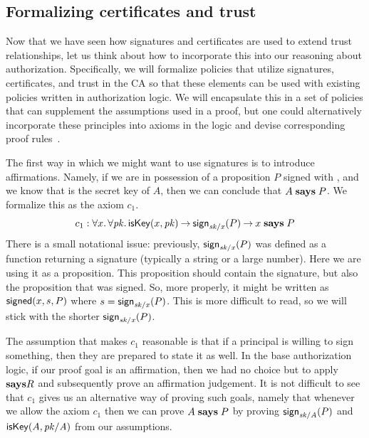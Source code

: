 \documentclass[11pt]{article}
\begin{document}
\subsection{Formalizing certificates and trust}

Now that we have seen how signatures and certificates are used to
extend trust relationships, let us think about how to incorporate this
into our reasoning about authorization. Specifically, we will
formalize policies that utilize signatures, certificates, and trust in
the CA so that these elements can be used with existing policies
written in authorization logic. We will encapsulate this in a set of
policies that can supplement the assumptions used in a proof, but one
could alternatively incorporate these principles into axioms in the
logic and devise corresponding proof rules~\citep{Bauer03phd}.

The first way in which we might want to use signatures is to introduce
affirmations. Namely, if we are in possession of a proposition $P$ signed with
, and we know that  is the secret key of $A$, then we can conclude
that $A \mathrel{\mathbf{says}} P$. We formalize this as the axiom $c_1$.
\[
  c_1 : \forall x.\, \forall \mathit{pk}.\, \mathsf{isKey}(x, \mathit{pk}) \mathbin{\rightarrow} \mathsf{sign}_{\mathit{sk/x}}(P) \mathbin{\rightarrow} x \mathrel{\mathbf{says}} P
\]
There is a small notational issue: previously, $\mathsf{sign}_{\mathit{sk/x}}(P)$ was defined
as a function returning a signature (typically a string or a large number).
Here we are using it as a proposition.  This proposition should contain the
signature, but also the proposition that was signed.  So, more properly, it
might be written as $\mathsf{signed}(x, s, P)$ where $s = \mathsf{sign}_{\mathit{sk/x}}(P)$.
This is more difficult to read, so we will stick with the shorter
$\mathsf{sign}_{\mathit{sk/x}}(P)$.

The assumption that makes $c_1$ reasonable is that if a principal is willing to
sign something, then they are prepared to state it as well.  In the base
authorization logic, if our proof goal is an affirmation, then we had no
choice but to apply ${\mathrel{\mathbf{says}}}R$ and subsequently prove an affirmation
judgement. It is not difficult to see that $c_1$ gives us an alternative way of
proving such goals, namely that whenever we allow the axiom $c_1$ then we can
prove $A \mathrel{\mathbf{says}} P$ by proving $\mathsf{sign}_{\mathit{sk/A}}(P)$ and $\mathsf{isKey}(A, \mathit{pk/A})$
from our assumptions.
\end{document}
